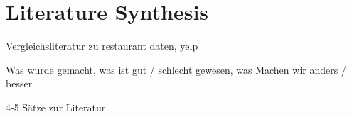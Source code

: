 \section{Literature Synthesis}
\label{sec:synthesis}

Vergleichsliteratur zu restaurant daten, yelp

Was wurde gemacht, was ist gut / schlecht gewesen, was Machen wir anders / besser

4-5 Sätze zur Literatur
